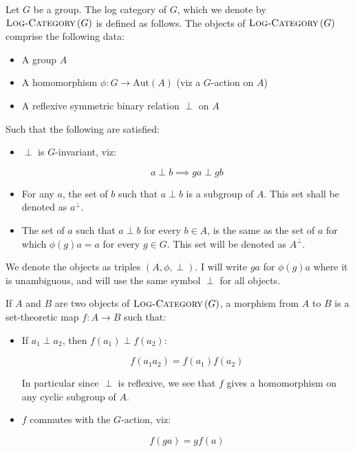\documentclass[a4paper]{amsart}
\newcommand{\logcategory}[1]{\textsc{Log-Category}\left(#1\right)}
\newcommand{\aut}[1]{\text{Aut}\left(#1\right)}
\begin{document}
\begin{definer}
  Let $G$ be a group. The log category of $G$, which we denote by
  $\logcategory{G}$ is defined as follows. The objects of
  $\logcategory{G}$ comprise the following data:

  \begin{itemize}

  \item A group $A$

  \item A homomorphism $\phi: G \to \aut{A}$ (viz a $G$-action on $A$)

  \item A reflexive symmetric binary relation $\perp$ on $A$

  \end{itemize}

  Such that the following are satisfied:

  \begin{itemize}

  \item $\perp$ is $G$-invariant, viz:

    $$a \perp b \implies ga \perp gb$$
  \item For any $a$, the set of $b$ such that $a \perp b$ is a
    subgroup of $A$. This set shall be denoted as $a^\perp$.

  \item The set of $a$ such that $a \perp b$ for every $b \in A$, is
    the same as the set of $a$ for which $\phi(g)a = a$ for every $g
    \in G$. This set will be denoted as $A^\perp$.
  \end{itemize}

  We denote the objects as triples $(A,\phi,\perp)$. I will write $ga$
  for $\phi(g)a$ where it is unambiguous, and will use the same symbol
  $\perp$ for all objects.

  If $A$ and $B$ are two objects of $\logcategory{G}$, a morphism from
  $A$ to $B$ is a set-theoretic map $f: A \to B$ such that:

  \begin{itemize}

  \item If $a_1 \perp a_2$, then $f(a_1) \perp f(a_2)$:

    $$f(a_1a_2) = f(a_1)f(a_2)$$

    In particular since $\perp$ is reflexive, we see that $f$ gives a
    homomorphism on any cyclic subgroup of $A$.

  \item $f$ commutes with the $G$-action, viz:

    $$f(ga) = gf(a)$$
  \end{itemize}
\end{definer}
\end{document}

